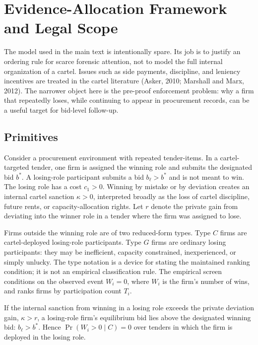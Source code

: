 \section{Evidence-Allocation Framework and Legal Scope}
\label{app:framework_submission}

The model used in the main text is intentionally spare. Its job
is to justify an ordering rule for scarce forensic attention,
not to model the full internal organization of a cartel. Issues
such as side payments, discipline, and leniency incentives are
treated in the cartel literature
(Asker, 2010; Marshall and Marx, 2012). The narrower
object here is the pre-proof enforcement problem: why a firm
that repeatedly loses, while continuing to appear in procurement
records, can be a useful target for bid-level follow-up.

\subsection{Primitives}
\label{app:framework_primitives}

Consider a procurement environment with repeated tender-items.
In a cartel-targeted tender, one firm is assigned the winning
role and submits the designated bid $b^*$. A losing-role
participant submits a bid $b_\ell>b^*$ and is not meant to win.
The losing role has a cost $c_1>0$. Winning by mistake or by
deviation creates an internal cartel sanction $\kappa>0$,
interpreted broadly as the loss of cartel discipline, future
rents, or capacity-allocation rights. Let $r$ denote the private
gain from deviating into the winner role in a tender where the
firm was assigned to lose.

Firms outside the winning role are of two reduced-form types.
Type $C$ firms are cartel-deployed losing-role participants. Type
$G$ firms are ordinary losing participants: they may be
inefficient, capacity constrained, inexperienced, or simply
unlucky. The type notation is a device for stating the maintained
ranking condition; it is not an empirical classification rule.
The empirical screen conditions on the observed event
$W_i=0$, where $W_i$ is the firm's number of wins, and ranks
firms by participation count $T_i$.

\begin{lemma}
\label{lem:submission_zero_win}
If the internal sanction from winning in a losing role exceeds
the private deviation gain, $\kappa>r$, a losing-role firm's
equilibrium bid lies above the designated winning bid:
$b_\ell>b^*$. Hence $\Pr(W_i>0\mid C)=0$ over tenders in which
the firm is deployed in the losing role.
\end{lemma}

